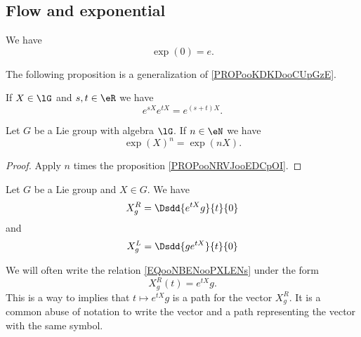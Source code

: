 \subsection{Flow and exponential}

\begin{lemma}       \label{LEMooEQFHooRjUAin}
    We have
    \begin{equation}
        \exp(0)=e.
    \end{equation}
\end{lemma}

The following proposition is a generalization of \ref{PROPooKDKDooCUpGzE}.
\begin{proposition}     \label{PROPooNRVJooEDCpOI}
    If \( X\in \lG\) and \( s,t\in \eR\) we have
    \begin{equation}
        e^{sX} e^{tX}= e^{(s+t)X}.
    \end{equation}
\end{proposition}

\begin{lemma}       \label{LEMooRPHVooAtZJnz}
    Let \( G\) be a Lie group with algebra \( \lG\). If \( n\in \eN\) we have
    \begin{equation}
        \exp(X)^n=\exp(nX).
    \end{equation}
\end{lemma}

\begin{proof}
    Apply \( n\) times the proposition \ref{PROPooNRVJooEDCpOI}.
\end{proof}

\begin{lemma}       \label{LEMooLMTZooCvunSl}
    Let \( G\) be a Lie group and \( X\in G\). We have
    \begin{equation}        \label{EQooNBENooPXLENs}
        X^R_g=\Dsdd{  e^{tX}g }{t}{0}
    \end{equation}
    and
    \begin{equation}
        X^L_g=\Dsdd{  ge^{tX} }{t}{0}
    \end{equation}
\end{lemma}

\begin{normaltext}      \label{NORMooSATDooIhwXXr}
    We will often write the relation \eqref{EQooNBENooPXLENs} under the form
    \begin{equation}
        X^R_g(t)= e^{tX}g.
    \end{equation}
    This is a way to implies that \( t\mapsto  e^{tX}g\) is a path for the vector \( X^R_g\). It is a common abuse of notation to write the vector and a path representing the vector with the same symbol.
\end{normaltext}

